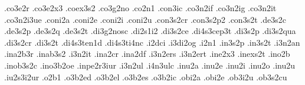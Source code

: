 {.co3e2r                           %
.co3e2x3                          %
.coex3s2                          %
.co3g2no                          %
.co2n1
.con3ic                           %
.co3n2if .co3n2ig .co3n2it .co3n2i3ue %
.coni2a .coni2e .coni2i .coni2u   %
.con3s2cr                         %
.con3s2p2                         %
.con3s2t                          %
.de3s2c                           %
.de3s2p                           %
.de3s2q                           %
.de3s2t                           %
.di3g2nosc                        %
.di2s1i2                          %
.di3s2ce                          %
.di4s3cep3t                       %
.di3s2p                           %
.di3s2qua                         %
.di3s2cr                          %
.di3s2t                           %
.di4s3ten1d                       %
.di4s3ti4nc                       %
.i2dci                            %
.i3di2og                          %
.i2n1 .in3s2p .in3s2t             %
.i3n2an .ina2b3r .inab3s2 .i3n2it %
.ina2cr .ina2df                   %
.i3n2ers .i3n2ert                 %
.ine2x3                           %
.inexs2t                          %
.ino2b                            %
.inob3s2c                         %
.ino3b2oe                         %
.inpe2r3iur                       %
.i3n2ul                           %
.i4n3ulc                          %
.inu2a .inu2e .inu2i .inu2o .inu2u %
.iu2s3i2ur                        %
.o2b1
.o3b2ed                           %
.o3b2el                           %
.o3b2es                           %
.o3b2ic                           %
.obi2a .obi2e .ob3i2u             %
.ob3s2cu                          %
}
